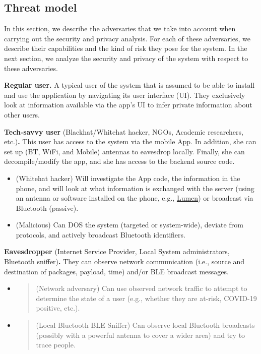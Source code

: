 \documentclass{article}
\begin{document}
\subsection{Threat model}\label{threat-model}

In this section, we describe the adversaries that we take into account
when carrying out the security and privacy analysis. For each of these
adversaries, we describe their capabilities and the kind of risk they
pose for the system. In the next section, we analyze the security and
privacy of the system with respect to these adversaries.

\textbf{Regular user.} A typical user of the system that is assumed to
be able to install and use the application by navigating its user
interface (UI). They exclusively look at information available via the
app's UI to infer private information about other users.

\textbf{Tech-savvy user} (Blackhat/Whitehat hacker, NGOs, Academic
researchers, etc.)\textbf{.} This user has access to the system via the
mobile App. In addition, she can set up (BT, WiFi, and Mobile) antennas
to eavesdrop locally. Finally, she can decompile/modify the app, and she
has access to the backend source code.

\begin{itemize}
\item
  (Whitehat hacker) Will investigate the App code, the information in
  the phone, and will look at what information is exchanged with the
  server (using an antenna or software installed on the phone, e.g.,
  \href{https://haystack.mobi/}{{Lumen}}) or broadcast via Bluetooth
  (passive).
\item
  (Malicious) Can DOS the system (targeted or system-wide), deviate from
  protocols, and actively broadcast Bluetooth identifiers.
\end{itemize}

\textbf{Eavesdropper} (Internet Service Provider, Local System
administrators, Bluetooth sniffer)\textbf{.} They can observe network
communication (i.e., source and destination of packages, payload, time)
and/or BLE broadcast messages.

\begin{itemize}
\item
  \begin{quote}
  (Network adversary) Can use observed network traffic to attempt to
  determine the state of a user (e.g., whether they are at-risk,
  COVID-19 positive, etc.).
  \end{quote}
\item
  \begin{quote}
  (Local Bluetooth BLE Sniffer) Can observe local Bluetooth broadcasts
  (possibly with a powerful antenna to cover a wider area) and try to
  trace people.
  \end{quote}
\end{itemize}
\end{document}

